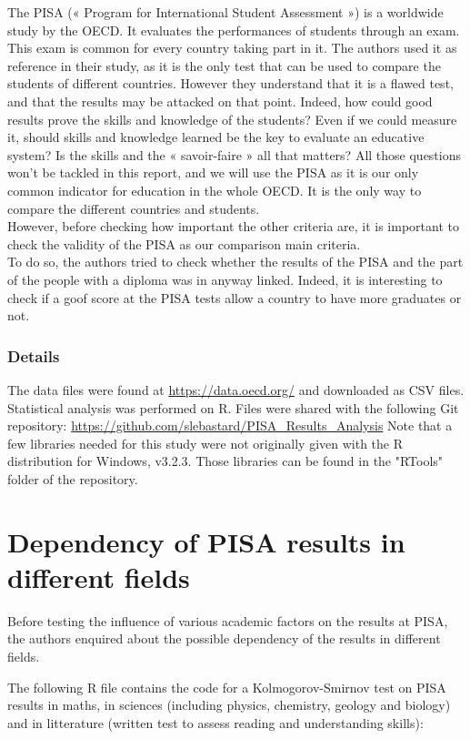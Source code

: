\documentclass[12pt,a4paper]{article}
\begin{document}
The PISA (« Program for International Student Assessment ») is a worldwide study by the OECD. It evaluates the performances of students through an exam. This exam is common for every country taking part in it. The authors used it as reference in their study, as it is the only test that can be used to compare the students of different countries. However they understand that it is a flawed test, and that the results may be attacked on that point. Indeed, how could good results prove the skills and knowledge of the students? Even if we could measure it, should skills and knowledge learned be the key to evaluate an educative system? Is the skills and the « savoir-faire » all that matters? All those questions won’t be tackled in this report, and we will use the PISA as it is our only common indicator for education in the whole OECD. It is the only way to compare the different countries and students.
\\
However, before checking how important the other criteria are, it is important to check the validity of the PISA as our comparison main criteria.
\\
To do so, the authors tried to check whether the results of the PISA and the part of the people with a diploma was in anyway linked. Indeed, it is interesting to check if a goof score at the PISA tests allow a country to have more graduates or not.

\subsubsection{Details}

The data files were found at \url{https://data.oecd.org/} and downloaded as CSV files.
Statistical analysis was performed on R. Files were shared with the following Git repository:
\url{https://github.com/slebastard/PISA\_Results\_Analysis}
Note that a few libraries needed for this study were not originally given with the R distribution for Windows, v3.2.3. Those libraries can be found in the "RTools" folder of the repository.

\section{Dependency of PISA results in different fields}

Before testing the influence of various academic factors on the results at PISA, the authors enquired about the possible dependency of the results in different fields.

The following R file contains the code for a Kolmogorov-Smirnov test on PISA results in maths, in sciences (including physics, chemistry, geology and biology) and in litterature (written test to assess reading and understanding skills):
\end{document}
